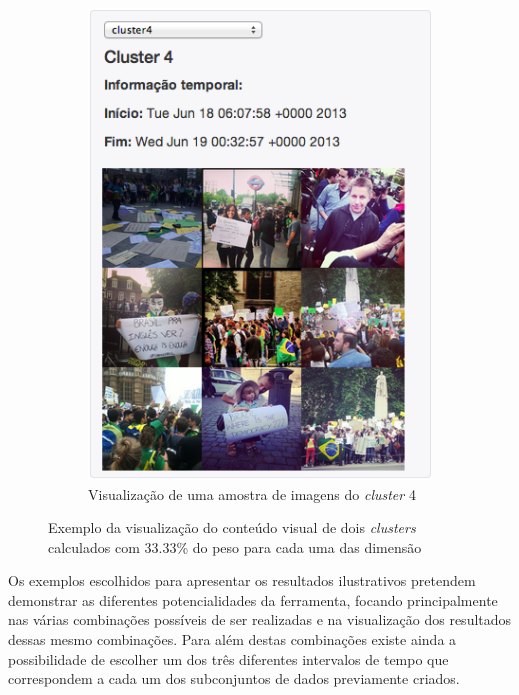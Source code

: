\begin{figure}[t!]
\begin{subfigure}[b]{0.45\textwidth}
	\includegraphics[width=0.9\linewidth]{./figures/olhopassarinho/c4_ex1_im33_e33_t33_1819}
	\caption{ Visualização de uma amostra de imagens do \textit{cluster} 4 }
	\label{subfig:im42}
	\end{subfigure}
\caption{Exemplo da visualização do conteúdo visual de dois \textit{clusters} calculados com 33.33\% do peso para cada uma das dimensão}
\label{fig:im40}
\end{figure}

Os exemplos escolhidos para apresentar os resultados ilustrativos pretendem demonstrar as diferentes potencialidades da ferramenta, focando principalmente nas várias combinações possíveis de ser realizadas e na visualização dos resultados dessas mesmo combinações. Para além destas combinações existe ainda a possibilidade de escolher um dos três diferentes intervalos de tempo que correspondem a cada um dos subconjuntos de dados previamente criados.
